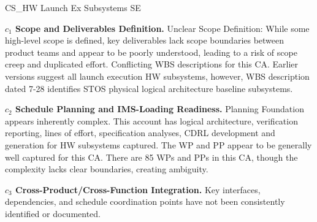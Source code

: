 %
\begin{frame}{CS\_HW Launch Ex Subsystems SE}
\begin{minipage}{0.90\textwidth}
\raggedright
\fontsize{8}{9.5}\selectfont
\textbf{\(c_1\) Scope and Deliverables Definition.}
Unclear Scope Definition: While some high-level scope is defined, key deliverables lack scope boundaries between product teams and appear to be poorly understood, leading to a risk of scope creep and duplicated effort. Conflicting WBS descriptions for this CA. Earlier versions suggest all launch execution HW subsystems, however, WBS description dated 7-28 identifies STOS physical logical architecture baseline subsystems.\par\vspace{0.6em}
\textbf{\(c_2\) Schedule Planning and IMS-Loading Readiness.}
Planning Foundation appears inherently complex. This account has logical architecture, verification reporting, lines of effort, specification analyses, CDRL development and generation for HW subsystems captured. The WP and PP appear to be generally well captured for this CA. There are 85 WPs and PPs in this CA, though the complexity lacks clear boundaries, creating ambiguity.\par\vspace{0.6em}
\textbf{\(c_3\) Cross-Product/Cross-Function Integration.}
Key interfaces, dependencies, and schedule coordination points have not been consistently identified or documented.\par\vspace{0.6em}
\end{minipage}
\end{frame}

\endinput
